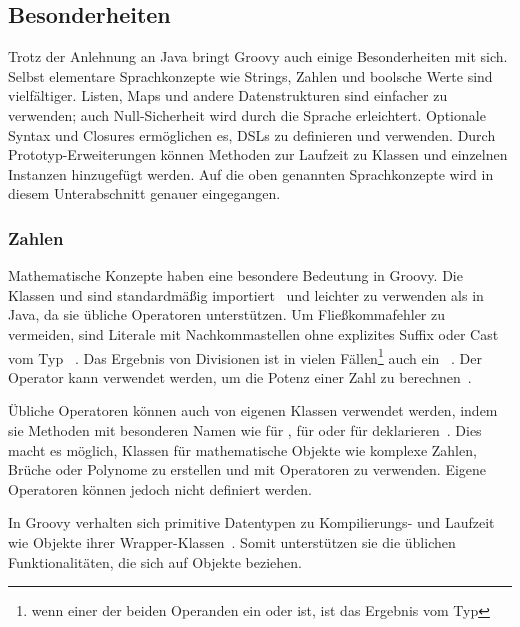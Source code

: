 \subsection{Besonderheiten}\label{subsec:besonderheiten}

Trotz der Anlehnung an Java bringt Groovy auch einige Besonderheiten mit sich.
Selbst elementare Sprachkonzepte wie Strings, Zahlen und boolsche Werte sind vielfältiger.
Listen, Maps und andere Datenstrukturen sind einfacher zu verwenden; auch Null-Sicherheit wird durch die Sprache erleichtert.
Optionale Syntax und Closures ermöglichen es, DSLs zu definieren und verwenden.
Durch Prototyp-Erweiterungen können Methoden zur Laufzeit zu Klassen und einzelnen Instanzen hinzugefügt werden.
Auf die oben genannten Sprachkonzepte wird in diesem Unterabschnitt genauer eingegangen.

\subsubsection{Zahlen}\label{subsubsec:zahlen}

Mathematische Konzepte haben eine besondere Bedeutung in Groovy.
Die Klassen  und  sind standardmäßig importiert~\cite[Abs.~1.]{groovy-lang:differences} und leichter zu verwenden als in Java, da sie übliche Operatoren unterstützen.
Um Fließkommafehler zu vermeiden, sind Literale mit Nachkommastellen ohne explizites Suffix oder Cast vom Typ ~\cite[Abs.~5.2.]{groovy-lang:syntax}.
Das Ergebnis von Divisionen ist in vielen Fällen\footnote{wenn einer der beiden Operanden ein  oder  ist, ist das Ergebnis vom Typ } auch ein ~\cite[Abs.~5.5.1.]{groovy-lang:syntax}.
Der Operator \code{**} kann verwendet werden, um die Potenz einer Zahl zu berechnen~\cite[Abs.~5.5.2.]{groovy-lang:syntax}.

Übliche Operatoren können auch von eigenen Klassen verwendet werden, indem sie Methoden mit besonderen Namen wie  für \code{+},  für \code{<<} oder  für \code{++} deklarieren~\cite[Abs.~10.]{groovy-lang:operators}.
Dies macht es möglich, Klassen für mathematische Objekte wie komplexe Zahlen, Brüche oder Polynome zu erstellen und mit Operatoren zu verwenden.
Eigene Operatoren können jedoch nicht definiert werden.

In Groovy verhalten sich primitive Datentypen zu Kompilierungs- und Laufzeit wie Objekte ihrer Wrapper-Klassen~\cite[Abs.~10.]{groovy-lang:differences}.
Somit unterstützen sie die üblichen Funktionalitäten, die sich auf Objekte beziehen.

